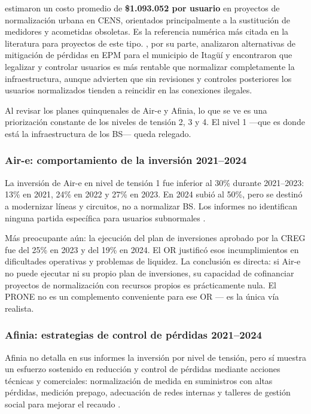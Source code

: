 \textcite{CabralesSanjuan2015} estimaron un costo promedio de
\textbf{\$1.093.052 por usuario} en proyectos de normalización urbana
en CENS, orientados principalmente a la sustitución de medidores y
acometidas obsoletas. Es la referencia numérica más citada en la
literatura para proyectos de este tipo. \textcite{PenaMantilla2020},
por su parte, analizaron alternativas de mitigación de pérdidas en EPM
para el municipio de Itagüí y encontraron que legalizar y controlar
usuarios es más rentable que normalizar completamente la infraestructura,
aunque advierten que sin revisiones y controles posteriores los usuarios
normalizados tienden a reincidir en las conexiones ilegales.

Al revisar los planes quinquenales de Air-e y Afinia, lo que se ve es
una priorización constante de los niveles de tensión 2, 3 y 4. El nivel
1 —que es donde está la infraestructura de los BS— queda relegado.

\subsubsection{Air-e: comportamiento de la inversión 2021--2024}
\label{subsubsec:aire_inversion}

La inversión de Air-e en nivel de tensión 1 fue inferior al 30\% durante
2021--2023: 13\% en 2021, 24\% en 2022 y 27\% en 2023. En 2024 subió al
50\%, pero se destinó a modernizar líneas y circuitos, no a normalizar
BS. Los informes no identifican ninguna partida específica para usuarios
subnormales \parencite{Aire2021, Aire2022, Aire2023, Aire2024}.

Más preocupante aún: la ejecución del plan de inversiones aprobado por
la CREG fue del 25\% en 2023 y del 19\% en 2024. El OR justificó esos
incumplimientos en dificultades operativas y problemas de liquidez. La
conclusión es directa: si Air-e no puede ejecutar ni su propio plan de
inversiones, su capacidad de cofinanciar proyectos de normalización con
recursos propios es prácticamente nula. El PRONE no es un complemento
conveniente para ese OR — es la única vía realista.

\subsubsection{Afinia: estrategias de control de pérdidas 2021--2024}
\label{subsubsec:afinia_perdidas}

Afinia no detalla en sus informes la inversión por nivel de tensión, pero
sí muestra un esfuerzo sostenido en reducción y control de pérdidas
mediante acciones técnicas y comerciales: normalización de medida en
suministros con altas pérdidas, medición prepago, adecuación de redes
internas y talleres de gestión social para mejorar el recaudo
\parencite{Afinia2021, Afinia2022, Afinia2023, Afinia2024}.

